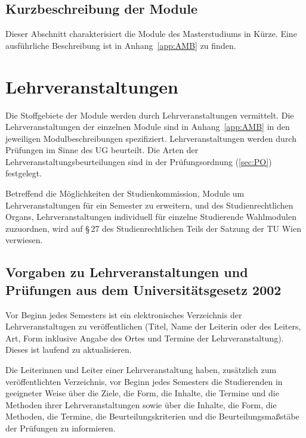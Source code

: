 \subsection*{Kurzbeschreibung der Module}

Dieser Abschnitt charakterisiert die Module des Masterstudiums
\emph{} in Kürze. Eine ausführliche Beschreibung ist in
Anhang~\ref{app:AMB} zu finden.

%

\section{Lehrveranstaltungen}\label{sec:LVS}

Die Stoffgebiete der Module werden durch Lehrveranstaltungen
vermittelt.  Die Lehrveranstaltungen der einzelnen Module sind in
Anhang~\ref{app:AMB} in den jeweiligen Modulbeschreibungen
spezifiziert.  Lehrveranstaltungen werden durch Prüfungen im Sinne des
UG beurteilt.  Die Arten der Lehrveranstaltungsbeurteilungen sind in
der Prüfungsordnung (\ref{sec:PO}) festgelegt.

Betreffend die Möglichkeiten der Studienkommission, Module um 
Lehrveranstaltungen für ein Semester zu erweitern, und des 
Studienrechtlichen Organs, Lehrveranstaltungen individuell für 
einzelne Studierende Wahlmodulen zuzuordnen, wird auf §\,27 
des Studienrechtlichen Teils der Satzung der TU Wien verwiesen.


\subsection*{Vorgaben zu Lehrveranstaltungen und Prüfungen aus dem
  Universitätsgesetz 2002}

Vor Beginn jedes Semesters ist ein elektronisches Verzeichnis der
Lehrveranstaltugen zu veröffentlichen (Titel, Name der Leiterin oder
des Leiters, Art, Form inklusive Angabe des Ortes und Termine der
Lehrveranstaltung). Dieses ist laufend zu aktualisieren.

Die Leiterinnen und Leiter einer Lehrveranstaltung haben, zusätzlich
zum veröffentlichten Verzeichnis, vor Beginn jedes Semesters die
Studierenden in geeigneter Weise über die Ziele, die Form, die
Inhalte, die Termine und die Methoden ihrer Lehrveranstaltungen sowie
über die Inhalte, die Form, die Methoden, die Termine, die
Beurteilungskriterien und die Beurteilungsmaßstäbe der Prüfungen zu
informieren.

